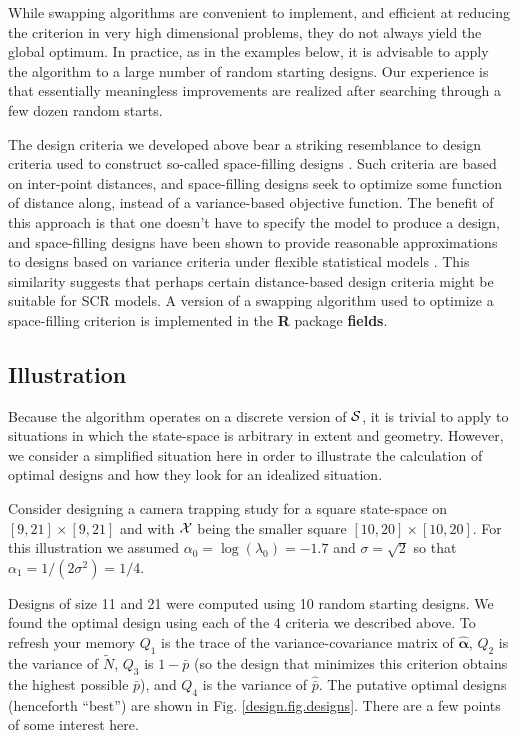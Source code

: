 While swapping algorithms are convenient to implement, and efficient
at reducing the criterion in very high dimensional problems, they do
not always yield the global optimum.  In practice, as in the examples
below, it is advisable to apply the algorithm to a large number of
random starting designs.  Our experience is that essentially
meaningless improvements are realized after searching through a few
dozen random starts.

The design criteria we developed above bear a striking resemblance
to design criteria used to construct so-called space-filling designs
\citep{nychka_etal:1997}. Such criteria are based on inter-point
distances, and space-filling designs seek to optimize some function of
distance along, instead of a variance-based objective function. The
benefit of this approach is that one doesn't have to specify the model
to produce a design, and space-filling designs have been shown to
provide reasonable approximations to designs based on variance
criteria under flexible
statistical models \citep{nychka_etal:1997}. 
This similarity suggests that perhaps
certain distance-based design criteria might be suitable for SCR
models. A version of a swapping algorithm used to
optimize a space-filling criterion is implemented in the {\bf R}
package {\bf fields}.


\subsection{Illustration}

Because the algorithm operates on a discrete version of ${\cal S}$,
it is trivial to apply to situations in which the
state-space is arbitrary in extent and geometry. However, we consider
a simplified situation here in order to illustrate the calculation of
optimal designs and how they look for an idealized situation.

Consider designing a camera trapping study for a square state-space on
$[9,21] \times [9, 21]$ and with ${\cal X}$ being the smaller square
$[10,20] \times [10,20]$.  For this illustration we assumed
$\alpha_{0} = \log(\lambda_{0}) = -1.7$ and $\sigma=\sqrt{2}$ so that
$\alpha_{1} = 1/(2\sigma^{2}) = 1/4$.

Designs of size 11 and 21 were computed using 10 random starting
designs.  We found the optimal design using each of the 4 criteria we
described above. To refresh your memory $Q_{1}$ is the trace of the
variance-covariance matrix of $\hat{\bm \alpha}$, $Q_{2}$ is the
variance of $\tilde{N}$, $Q_{3}$ is $1-\bar{p}$ (so the design that
minimizes this criterion obtains the highest possible $\bar{p}$), and
$Q_{4}$ is the variance of $\hat{\bar{p}}$.  The putative optimal
designs (henceforth ``best'') are shown in
Fig. \ref{design.fig.designs}. There are a few points of some interest
here.

